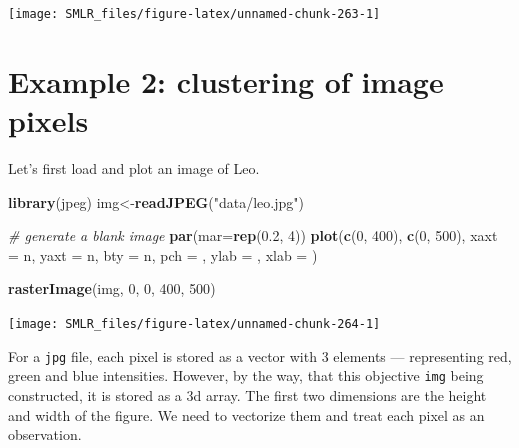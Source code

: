 \documentclass[
]{book}
\newenvironment{Shaded}{\begin{snugshade}}{\end{snugshade}}
\newcommand{\AttributeTok}[1]{\textcolor[rgb]{0.13,0.29,0.53}{#1}}
\newcommand{\CommentTok}[1]{\textcolor[rgb]{0.56,0.35,0.01}{\textit{#1}}}
\newcommand{\DecValTok}[1]{\textcolor[rgb]{0.00,0.00,0.81}{#1}}
\newcommand{\FloatTok}[1]{\textcolor[rgb]{0.00,0.00,0.81}{#1}}
\newcommand{\FunctionTok}[1]{\textcolor[rgb]{0.13,0.29,0.53}{\textbf{#1}}}
\newcommand{\NormalTok}[1]{#1}
\newcommand{\OtherTok}[1]{\textcolor[rgb]{0.56,0.35,0.01}{#1}}
\newcommand{\StringTok}[1]{\textcolor[rgb]{0.31,0.60,0.02}{#1}}
\theoremstyle{definition}
\theoremstyle{definition}
\theoremstyle{definition}
\theoremstyle{definition}
\theoremstyle{remark}
\begin{document}
\begin{center}\texttt{[image: SMLR\_files/figure-latex/unnamed-chunk-263-1]} \end{center}

\hypertarget{example-2-clustering-of-image-pixels}{%
\section{Example 2: clustering of image pixels}\label{example-2-clustering-of-image-pixels}}

Let's first load and plot an image of Leo.

\begin{Shaded}
\begin{Highlighting}[]
    \FunctionTok{library}\NormalTok{(jpeg)}
\NormalTok{    img}\OtherTok{\textless{}{-}}\FunctionTok{readJPEG}\NormalTok{(}\StringTok{"data/leo.jpg"}\NormalTok{)}
    
    \CommentTok{\# generate a blank image}
    \FunctionTok{par}\NormalTok{(}\AttributeTok{mar=}\FunctionTok{rep}\NormalTok{(}\FloatTok{0.2}\NormalTok{, }\DecValTok{4}\NormalTok{))}
    \FunctionTok{plot}\NormalTok{(}\FunctionTok{c}\NormalTok{(}\DecValTok{0}\NormalTok{, }\DecValTok{400}\NormalTok{), }\FunctionTok{c}\NormalTok{(}\DecValTok{0}\NormalTok{, }\DecValTok{500}\NormalTok{), }\AttributeTok{xaxt =} \StringTok{\textquotesingle{}n\textquotesingle{}}\NormalTok{, }\AttributeTok{yaxt =} \StringTok{\textquotesingle{}n\textquotesingle{}}\NormalTok{, }
         \AttributeTok{bty =} \StringTok{\textquotesingle{}n\textquotesingle{}}\NormalTok{, }\AttributeTok{pch =} \StringTok{\textquotesingle{}\textquotesingle{}}\NormalTok{, }\AttributeTok{ylab =} \StringTok{\textquotesingle{}\textquotesingle{}}\NormalTok{, }\AttributeTok{xlab =} \StringTok{\textquotesingle{}\textquotesingle{}}\NormalTok{)}

    \FunctionTok{rasterImage}\NormalTok{(img, }\DecValTok{0}\NormalTok{, }\DecValTok{0}\NormalTok{, }\DecValTok{400}\NormalTok{, }\DecValTok{500}\NormalTok{)}
\end{Highlighting}
\end{Shaded}

\begin{center}\texttt{[image: SMLR\_files/figure-latex/unnamed-chunk-264-1]} \end{center}

For a \texttt{jpg} file, each pixel is stored as a vector with 3 elements --- representing red, green and blue intensities. However, by the way, that this objective \texttt{img} being constructed, it is stored as a 3d array. The first two dimensions are the height and width of the figure. We need to vectorize them and treat each pixel as an observation.
\end{document}
